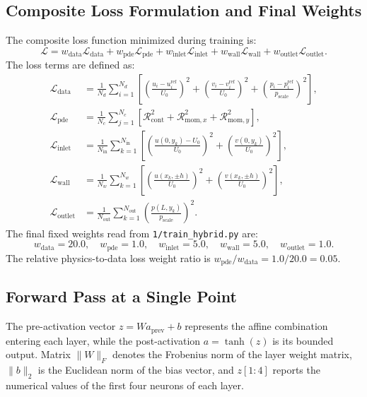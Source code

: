 \documentclass[11pt,a4paper]{article}
\begin{document}
\subsection{Composite Loss Formulation and Final Weights}
The composite loss function minimized during training is:
\begin{equation}
\mathcal{L} = w_{\mathrm{data}}\mathcal{L}_{\mathrm{data}} + w_{\mathrm{pde}}\mathcal{L}_{\mathrm{pde}} + w_{\mathrm{inlet}}\mathcal{L}_{\mathrm{inlet}} + w_{\mathrm{wall}}\mathcal{L}_{\mathrm{wall}} + w_{\mathrm{outlet}}\mathcal{L}_{\mathrm{outlet}}.
\end{equation}
The loss terms are defined as:
\begin{align}
\mathcal{L}_{\mathrm{data}} &= \frac{1}{N_d} \sum_{i=1}^{N_d} \left[ \left(\frac{u_i - u_i^{\mathrm{ref}}}{U_0}\right)^2 + \left(\frac{v_i - v_i^{\mathrm{ref}}}{U_0}\right)^2 + \left(\frac{p_i - p_i^{\mathrm{ref}}}{p_{\mathrm{scale}}}\right)^2 \right], \\
\mathcal{L}_{\mathrm{pde}} &= \frac{1}{N_c} \sum_{j=1}^{N_c} \left[ \mathcal{R}_{\mathrm{cont}}^2 + \mathcal{R}_{\mathrm{mom},x}^2 + \mathcal{R}_{\mathrm{mom},y}^2 \right], \\
\mathcal{L}_{\mathrm{inlet}} &= \frac{1}{N_{\mathrm{in}}} \sum_{k=1}^{N_{\mathrm{in}}} \left[ \left(\frac{u(0, y_k) - U_0}{U_0}\right)^2 + \left(\frac{v(0, y_k)}{U_0}\right)^2 \right], \\
\mathcal{L}_{\mathrm{wall}} &= \frac{1}{N_w} \sum_{k=1}^{N_w} \left[ \left(\frac{u(x_k, \pm h)}{U_0}\right)^2 + \left(\frac{v(x_k, \pm h)}{U_0}\right)^2 \right], \\
\mathcal{L}_{\mathrm{outlet}} &= \frac{1}{N_{\mathrm{out}}} \sum_{k=1}^{N_{\mathrm{out}}} \left(\frac{p(L, y_k)}{p_{\mathrm{scale}}}\right)^2.
\end{align}
The final fixed weights read from \texttt{1/train\_hybrid.py} are:
\begin{equation}
w_{\mathrm{data}} = 20.0, \quad w_{\mathrm{pde}} = 1.0, \quad w_{\mathrm{inlet}} = 5.0, \quad w_{\mathrm{wall}} = 5.0, \quad w_{\mathrm{outlet}} = 1.0.
\end{equation}
The relative physics-to-data loss weight ratio is $w_{\mathrm{pde}} / w_{\mathrm{data}} = 1.0 / 20.0 = \mathbf{0.05}$.

\subsection{Forward Pass at a Single Point}
The pre-activation vector $z = W a_{\mathrm{prev}} + b$ represents the affine combination entering each layer, while the post-activation $a = \tanh(z)$ is its bounded output. Matrix $\|W\|_F$ denotes the Frobenius norm of the layer weight matrix, $\|b\|_2$ is the Euclidean norm of the bias vector, and $z[1:4]$ reports the numerical values of the first four neurons of each layer.
\end{document}

